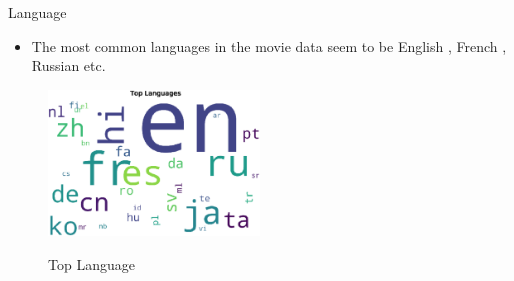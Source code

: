 \documentclass[
 size=14pt,
 paper=smartboard,  %
 mode=present, 		%
 display=slides, 	%
 style=tuliplab,  	%
 pauseslide,
 fleqn,leqno]{powerdot}
\begin{document}
\begin{slide}{Language}
  \begin{itemize}
    \item The most common languages in the movie data seem to be English , French , Russian  etc.
  \end{itemize}
  \begin{figure}[htbp]
    \centering
    \includegraphics[width=0.5\textwidth]{figures//language.eps}\\
    \caption{Top Language}
  \end{figure}
\end{slide}





\end{document}
